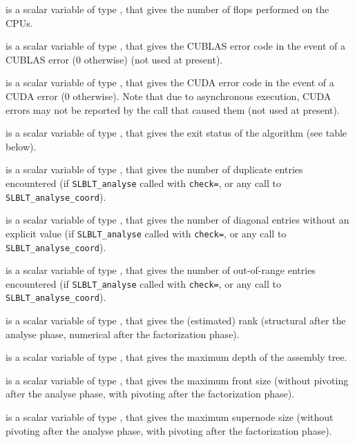 \documentclass{galahad}
\newcommand{\packagename}{SLBLT}
\begin{document}
\begin{description}

is a scalar variable of type \longinteger,
that gives the number of flops performed on the CPUs.

is a scalar variable of type \integer,
that gives the CUBLAS error code in the event of a CUBLAS error
(0 otherwise) (not used at present).

is a scalar variable of type \integer,
that gives the CUDA error code in the event of a CUDA error
(0 otherwise). Note that due to asynchronous execution, CUDA errors may
not be reported by the call that caused them  (not used at present).

is a scalar variable of type \integer,
that gives the exit status of the algorithm (see table below).


is a scalar variable of type \integer,
that gives the number of duplicate entries encountered (if
{\tt \packagename\_analyse} called with {\tt check=\true}, or any call to
{\tt \packagename\_analyse\_coord}).

is a scalar variable of type \integer,
that gives the number of diagonal entries without an
explicit value (if {\tt \packagename\_analyse} called with {\tt check=\true}, or
any call to {\tt \packagename\_analyse\_coord}).

is a scalar variable of type \integer,
that gives the number of out-of-range entries encountered (if
{\tt \packagename\_analyse} called with {\tt check=\true}, or any call to
{\tt \packagename\_analyse\_coord}).

is a scalar variable of type \integer,
that gives the (estimated) rank (structural after the analyse phase,
numerical after the factorization phase).

is a scalar variable of type \integer,
that gives the maximum depth of the assembly tree.

is a scalar variable of type \integer,
that gives the maximum front size (without pivoting after the analyse
phase, with pivoting after the factorization phase).

is a scalar variable of type \integer,
that gives the maximum supernode size (without pivoting after the
analyse phase, with pivoting after the  factorization phase).


\end{description}
\end{document}
